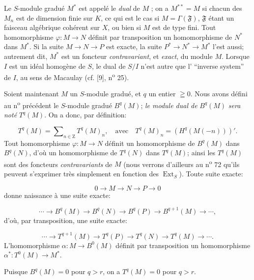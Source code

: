 Le $S$-module gradué $M^*$ est appelé le \textit{dual} de $M$ ; on a $M^{**} = M$ si chacun des $M_n$ est de dimension finie sur $K$, ce qui est le cas si $M = \Gamma(\mathfrak{F})$, $\mathfrak{F}$ étant un faisceau algébrique cohérent sur $X$, ou bien si $M$ est de type fini. Tout homomorphisme $\varphi : M \to N$ définit par transposition un homomorphisme de $N^*$ dans $M^*$. Si la suite $M \to N \to P$ est exacte, la suite $P^* \to N^* \to M^*$ l'est aussi; autrement dit, $M^*$ est un foncteur \textit{contravariant}, et \textit{exact}, du module $M$. Lorsque $I$ est un idéal homogène de $S$, le dual de $S/I$ n'est autre que l' ``inverse system'' de $I$, au sens de Macaulay (cf. [9], n\textsuperscript{o} 25).

Soient maintenant $M$ un $S$-module gradué, et $q$ un entier $\geqq 0$. Nous avons défini au n\textsuperscript{o} précédent le $S$-module gradué $B^q(M)$; \textit{le module dual de} $B^q(M)$ \textit{sera noté} $T^q(M)$. On a donc, par définition:

\begin{equation*}
T^q(M) = \sum\nolimits_{n \in \mathrm{Z}} T^q(M)_n , \quad \text{avec} \quad T^q(M)_n = (H^q(M(-n)))'.
\end{equation*}
Tout homomorphisme $\varphi : M \to N$ définit un homomorphisme de $B^q(M)$ dans $B^q(N)$, d'où un homomorphisme de $T^q(N)$ dans $T^q(M)$; ainsi les $T^q(M)$ sont des foncteurs \textit{contravariants} de $M$ (nous verrons d'ailleurs au n\textsuperscript{o} 72 qu'ils peuvent
s'exprimer très simplement en fonction des $\operatorname{Ext}_S$). Toute suite exacte:

\begin{equation*}
0 \to M \to N \to P \to 0
\end{equation*}
donne naissance à une suite exacte:

\begin{equation*}
\cdots \to B^q(M) \to B^q(N) \to B^q(P) \to B^{q+1}(M) \to \cdots ,
\end{equation*}
d'où, par transposition, une suite exacte:

\begin{equation*}
\cdots \to T^{q+1}(M) \to T^q(P) \to T^q(N) \to T^q(M) \to \cdots .
\end{equation*}
L'homomorphisme $\alpha : M \to B^0(M)$ définit par transposition un homomorphisme $\alpha^* : T^0(M) \to M^*$.

Puisque $B^q(M) = 0$ pour $q > r$, on a $T^q(M) = 0$ pour $q > r$.

